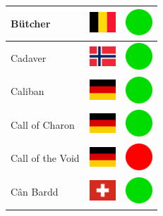 \documentclass[12pt, a4paper, twoside]{report}
\begin{document}
\begin{center}
\begin{longtable}{|p{5cm}|p{2cm}|p{2cm}|}
 Bütcher                                                    & \includegraphics[width=1cm]{../img/flags/be} &   \includegraphics[width=1cm]{../likes/y} \\ \hline
 Cadaver                                                    & \includegraphics[width=1cm]{../img/flags/no} &   \includegraphics[width=1cm]{../likes/y} \\ \hline
 Caliban                                                    & \includegraphics[width=1cm]{../img/flags/de} &   \includegraphics[width=1cm]{../likes/y} \\ \hline
 Call of Charon                                             & \includegraphics[width=1cm]{../img/flags/de} &   \includegraphics[width=1cm]{../likes/y} \\ \hline
 Call of the Void                                           & \includegraphics[width=1cm]{../img/flags/de} &   \includegraphics[width=1cm]{../likes/n} \\ \hline
 Cân Bardd                                                  & \includegraphics[width=1cm]{../img/flags/ch} &   \includegraphics[width=1cm]{../likes/y} \\ \hline

\end{longtable}
\end{center}
\end{document}
